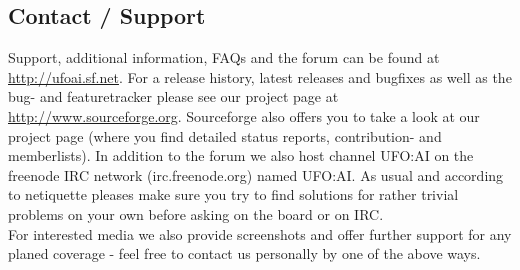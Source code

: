 \subsection{Contact / Support}
Support, additional information, FAQs and the forum can be found at \url{http://ufoai.sf.net}.
For a release history, latest releases and bugfixes as well as the bug- and featuretracker please see our project page at \url{http://www.sourceforge.org}.
Sourceforge also offers you to take a look at our project page (where you find detailed status reports, contribution- and memberlists). In addition to the forum we also host channel UFO:AI on the freenode IRC network (irc.freenode.org) named UFO:AI. As usual and according to netiquette pleases make sure you try to find solutions for rather trivial problems on your own before asking on the board or on IRC.\\
For interested media we also provide screenshots and offer further support for any planed coverage - feel free to contact us personally by one of the above ways.
